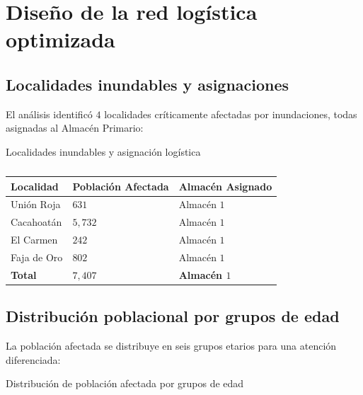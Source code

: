 \documentclass[
  spanish,
  us-letterpaper,
]{scrreprt}
\numberwithin{equation}{section}
\begin{document}
\section{Diseño de la red logística
optimizada}\label{diseuxf1o-de-la-red-loguxedstica-optimizada}

\subsection{Localidades inundables y
asignaciones}\label{localidades-inundables-y-asignaciones}

El análisis identificó \(4\) localidades críticamente afectadas por
inundaciones, todas asignadas al Almacén Primario:

Localidades inundables y asignación logística

\begin{longtable}[]{@{}lll@{}}

\caption{\label{tbl-localidades-inundables}}

\tabularnewline

\toprule\noalign{}
Localidad & Población Afectada & Almacén Asignado \\
\midrule\noalign{}
\endhead
\bottomrule\noalign{}
\endlastfoot
Unión Roja & \(631\) & Almacén \(1\) \\
Cacahoatán & \(5,732\) & Almacén \(1\) \\
El Carmen & \(242\) & Almacén \(1\) \\
Faja de Oro & \(802\) & Almacén \(1\) \\
\textbf{Total} & \textbf{\(7,407\)} & \textbf{Almacén \(1\)} \\

\end{longtable}

\subsection{Distribución poblacional por grupos de
edad}\label{distribuciuxf3n-poblacional-por-grupos-de-edad}

La población afectada se distribuye en seis grupos etarios para una
atención diferenciada:

Distribución de población afectada por grupos de edad
\end{document}
